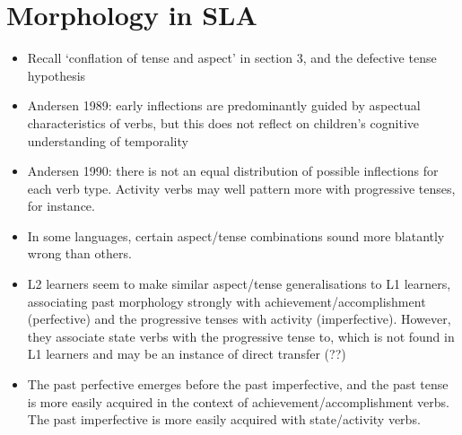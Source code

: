 \documentclass{article}
\begin{document}
\section{Morphology in SLA}
\begin{itemize}
    \item Recall `conflation of tense and aspect' in section 3, and the defective tense hypothesis
    \item Andersen 1989: early inflections are predominantly guided by aspectual characteristics of verbs, but this does not reflect on children's cognitive understanding of temporality
    \item Andersen 1990: there is not an equal distribution of possible inflections for each verb type. Activity verbs may well pattern more with progressive tenses, for instance.
    \item In some languages, certain aspect/tense combinations sound more blatantly wrong than others.
    \item L2 learners seem to make similar aspect/tense generalisations to L1 learners, associating past morphology strongly with achievement/accomplishment (perfective) and the progressive tenses with activity (imperfective). However, they associate state verbs with the progressive tense to, which is not found in L1 learners and may be an instance of direct transfer (??)
    \item The past perfective emerges before the past imperfective, and the past tense is more easily acquired in the context of achievement/accomplishment verbs. The past imperfective is more easily acquired with state/activity verbs.

\end{itemize}
\end{document}
